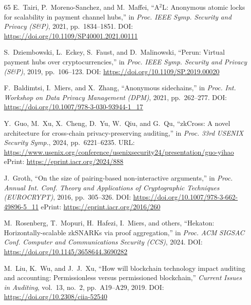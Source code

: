 \documentclass[journal]{IEEEtran}
\begin{document}
\begin{thebibliography}{65}
E.~Tairi, P.~Moreno-Sanchez, and M.~Maffei,
``A$^2$L: Anonymous atomic locks for scalability in payment channel hubs,''
in \textit{Proc. IEEE Symp. Security and Privacy (S\&P)}, 2021,
pp.~1834--1851.
\newblock DOI: \url{https://doi.org/10.1109/SP40001.2021.00111}

S.~Dziembowski, L.~Eckey, S.~Faust, and D.~Malinowski,
``Perun: Virtual payment hubs over cryptocurrencies,''
in \textit{Proc. IEEE Symp. Security and Privacy (S\&P)}, 2019,
pp.~106--123.
\newblock DOI: \url{https://doi.org/10.1109/SP.2019.00020}

F.~Baldimtsi, I.~Miers, and X.~Zhang,
``Anonymous sidechains,''
in \textit{Proc. Int. Workshop on Data Privacy Management (DPM)}, 2021,
pp.~262--277.
\newblock DOI: \url{https://doi.org/10.1007/978-3-030-93944-1_17}


Y.~Guo, M.~Xu, X.~Cheng, D.~Yu, W.~Qiu, and G.~Qu,
``zkCross: A novel architecture for cross-chain privacy-preserving auditing,''
in \textit{Proc. 33rd USENIX Security Symp.}, 2024, pp.~6221--6235.
\newblock URL: \url{https://www.usenix.org/conference/usenixsecurity24/presentation/guo-yihao}
\newblock ePrint: \url{https://eprint.iacr.org/2024/888}

J.~Groth,
``On the size of pairing-based non-interactive arguments,''
in \textit{Proc. Annual Int. Conf. Theory and Applications of Cryptographic
Techniques (EUROCRYPT)}, 2016, pp.~305--326.
\newblock DOI: \url{https://doi.org/10.1007/978-3-662-49896-5_11}
\newblock ePrint: \url{https://eprint.iacr.org/2016/260}

M.~Rosenberg, T.~Mopuri, H.~Hafezi, I.~Miers, and others,
``Hekaton: Horizontally-scalable zkSNARKs via proof aggregation,''
in \textit{Proc. ACM SIGSAC Conf. Computer and Communications Security
(CCS)}, 2024.
\newblock DOI: \url{https://doi.org/10.1145/3658644.3690282}

M.~Liu, K.~Wu, and J.~J.~Xu,
``How will blockchain technology impact auditing and accounting: Permissionless
versus permissioned blockchain,''
\textit{Current Issues in Auditing}, vol.~13, no.~2, pp.~A19--A29, 2019.
\newblock DOI: \url{https://doi.org/10.2308/ciia-52540}


\end{thebibliography}
\end{document}

